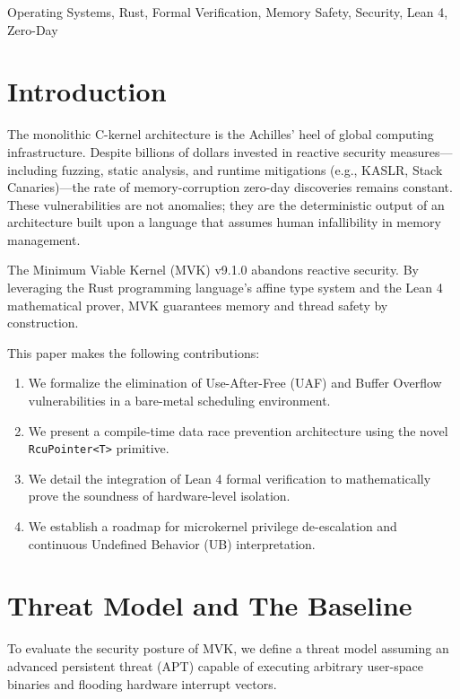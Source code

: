 \documentclass[conference]{IEEEtran}
\begin{document}
\begin{IEEEkeywords}
Operating Systems, Rust, Formal Verification, Memory Safety, Security, Lean 4, Zero-Day
\end{IEEEkeywords}

\section{Introduction}
The monolithic C-kernel architecture is the Achilles' heel of global computing infrastructure. Despite billions of dollars invested in reactive security measures---including fuzzing, static analysis, and runtime mitigations (e.g., KASLR, Stack Canaries)---the rate of memory-corruption zero-day discoveries remains constant. These vulnerabilities are not anomalies; they are the deterministic output of an architecture built upon a language that assumes human infallibility in memory management.

The Minimum Viable Kernel (MVK) v9.1.0 abandons reactive security. By leveraging the Rust programming language's affine type system and the Lean 4 mathematical prover, MVK guarantees memory and thread safety by construction.

This paper makes the following contributions:
\begin{enumerate}
    \item We formalize the elimination of Use-After-Free (UAF) and Buffer Overflow vulnerabilities in a bare-metal scheduling environment.
    \item We present a compile-time data race prevention architecture using the novel \texttt{RcuPointer<T>} primitive.
    \item We detail the integration of Lean 4 formal verification to mathematically prove the soundness of hardware-level isolation.
    \item We establish a roadmap for microkernel privilege de-escalation and continuous Undefined Behavior (UB) interpretation.
\end{enumerate}

\section{Threat Model and The Baseline}
To evaluate the security posture of MVK, we define a threat model assuming an advanced persistent threat (APT) capable of executing arbitrary user-space binaries and flooding hardware interrupt vectors.
\end{document}
